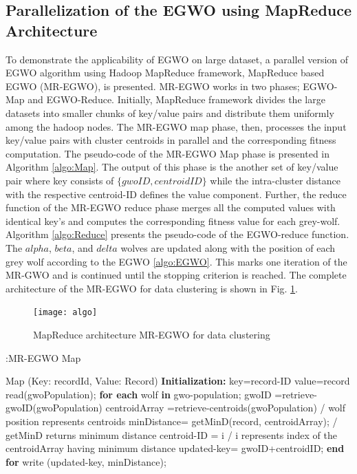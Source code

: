 \documentclass[review]{elsarticle}
\begin{document}
  \subsection{Parallelization of the EGWO using MapReduce Architecture}\label{sec:mpr}
To demonstrate the applicability of EGWO on large dataset, a parallel version of EGWO algorithm using Hadoop MapReduce framework, MapReduce based EGWO (MR-EGWO), is presented. MR-EGWO works in two phases; EGWO-Map and EGWO-Reduce. 
Initially, MapReduce framework divides the large datasets into smaller chunks of key/value pairs and distribute them uniformly among the hadoop nodes. The MR-EGWO map phase, then, processes the input key/value pairs with cluster centroids in  parallel and the corresponding fitness computation. The pseudo-code of the MR-EGWO Map phase is presented in Algorithm \ref{algo:Map}. The output of this phase is the another set of key/value pair where key consists of  $\{gwoID,centroidID\}$ while the intra-cluster distance with the respective centroid-ID defines the value component. Further, the reduce function of the MR-EGWO reduce phase merges all the computed values with identical key's and computes the corresponding fitness value for each grey-wolf. Algorithm \ref{algo:Reduce} presents the pseudo-code of the EGWO-reduce function. The $alpha$, $beta$, and $delta$ wolves are updated along with the position of each grey wolf according to the EGWO  \ref{algo:EGWO}.
This marks one iteration of the MR-GWO and is continued until the stopping criterion is reached. The complete architecture of the MR-EGWO for data clustering is shown in Fig. \ref{fig:EGWO}.   

      \begin{figure}
    \centering
     \texttt{[image: algo]}
      \caption{MapReduce architecture MR-EGWO for data clustering}
\label{fig:EGWO}
\end{figure}

\begin{algorithm}
\caption{ :MR-EGWO Map}
\small
\label{algo:Map}
\begin{algorithmic}
\STATE Map (Key: recordId, Value: Record)
\STATE \textbf{Initialization:}
\STATE  key=record-ID
\STATE  value=record
\STATE  read(gwoPopulation);
\STATE    \textbf{for each} wolf \textbf{in} gwo-population;
\STATE       gwoID   =retrieve-gwoID(gwoPopulation)
\STATE       centroidArray =retrieve-centroids(gwoPopulation)  / wolf position represents centroids 
\STATE   	minDistance= getMinD(record, centroidArray);     / getMinD returns minimum distance  
\STATE       centroid-ID =   i    / i represents index of the centroidArray having minimum distance
\STATE         updated-key= gwoID+centroidID;
\STATE      \textbf{end for}
  \STATE         write (updated-key, minDistance);
\end{algorithmic}
\end{algorithm}
\end{document}

